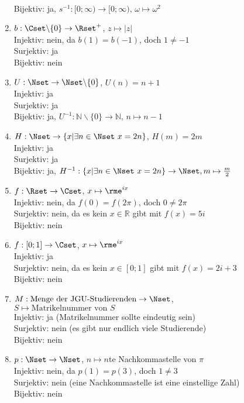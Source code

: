 \documentclass[12pt,answers]{exam}
\begin{document}
\begin{questions}
\begin{solution}
\begin{enumerate}
\\ Bijektiv: ja, $s^{-1}:[0;\infty)\to[0;\infty),\,\omega\mapsto \omega^2$
\item $b:\Cset\backslash\{0\}\to\Rset^+$, $z\mapsto |z|$
\\ Injektiv: nein, da $b(1)=b(-1)$, doch $1\neq -1$
\\ Surjektiv: ja
\\ Bijektiv: nein
\item $U:\Nset\to\Nset\backslash\{0\}$, $U(n)=n+1$
\\ Injektiv: ja
\\ Surjektiv: ja
\\ Bijektiv: ja, $U^{-1}:\mathbb{N}\backslash\{0\}\to\mathbb{N},\,n\mapsto n-1$
\item $H:\Nset\to\{x|\exists n\in\Nset~x=2n\}$, $H(m)=2m$
\\ Injektiv: ja
\\ Surjektiv: ja
\\ Bijektiv: ja, $H^{-1}:\{x|\exists n\in\Nset~x=2n\}\to\Nset, m\mapsto\frac{m}{2}$
\item $f:\Rset\to\Cset$, $x\mapsto\rme^{ix}$
\\ Injektiv: nein, da $f(0)=f(2\pi)$, doch $0\neq 2\pi$
\\ Surjektiv: nein, da es kein $x\in\mathbb{R}$ gibt mit $f(x)=5i$
\\ Bijektiv: nein
\item $f:[0;1]\to\Cset$, $x\mapsto\rme^{ix}$
\\ Injektiv: ja
\\ Surjektiv: nein, da es kein $x\in[0;1]$ gibt mit $f(x)=2i+3$
\\ Bijektiv: nein
\item $M: {\textrm{Menge der JGU-Studierenden}}\to \Nset$,\\ $S\mapsto{\textrm{Matrikelnummer von }S}$
\\ Injektiv: ja (Matrikelnummer sollte eindeutig sein)
\\ Surjektiv: nein (es gibt nur endlich viele Studierende)
\\ Bijektiv: nein
\item $p: \Nset\to\Nset$, $n\mapsto n$te Nachkommastelle von $\pi$
\\ Injektiv: nein, da $p(1)=p(3)$, doch $1\neq 3$
\\ Surjektiv: nein (eine Nachkommastelle ist eine einstellige Zahl)
\\ Bijektiv: nein
\end{enumerate}
\end{solution}




\end{questions}
\end{document}
